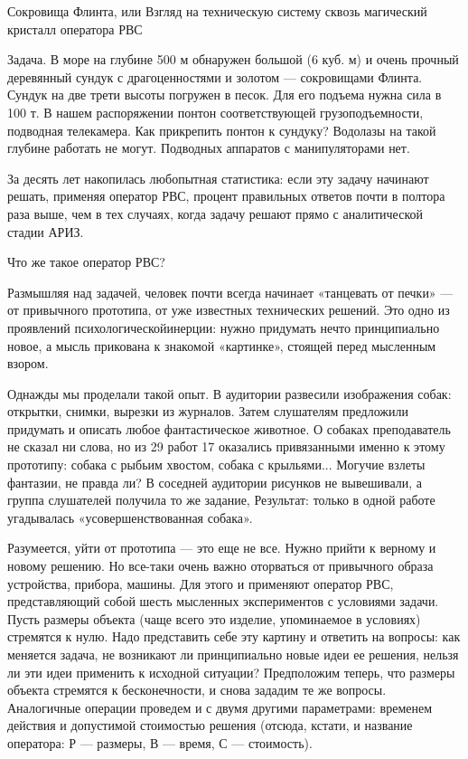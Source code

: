 Сокровища Флинта, или Взгляд  на техническую систему сквозь магический
кристалл оператора РВС

Задача.  В  море  на  глубине  500 м  обнаружен  большой  (6  куб.  м)
и  очень  прочный деревянный  сундук  с  драгоценностями и  золотом  —
сокровищами  Флинта. Сундук  на  две трети  высоты  погружен в  песок.
Для  его подъема  нужна  сила в  100 т.  В  нашем распоряжении  понтон
соответствующей грузоподъемности, подводная телекамера. Как прикрепить
понтон  к  сундуку?  Водолазы  на такой  глубине  работать  не  могут.
Подводных аппаратов с манипуляторами нет.

За  десять  лет  накопилась  любопытная статистика:  если  эту  задачу
начинают  решать, применяя  оператор РВС,  процент правильных  ответов
почти в  полтора раза  выше, чем  в тех  случаях, когда  задачу решают
прямо с аналитической стадии АРИЗ.

Что же такое оператор РВС?

Размышляя  над задачей,  человек почти  всегда начинает  «танцевать от
печки»  —  от  привычного  прототипа,  от  уже  известных  технических
решений.   Это  одно   из  проявлений   психологическойинерции:  нужно
придумать  нечто принципиально  новое,  а мысль  прикована к  знакомой
«картинке», стоящей перед мысленным взором.

Однажды  мы проделали  такой опыт.  В аудитории  развесили изображения
собак:  открытки,  снимки,  вырезки   из  журналов.  Затем  слушателям
предложили  придумать  и  описать  любое  фантастическое  животное.  О
собаках преподаватель не сказал ни слова,  но из 29 работ 17 оказались
привязанными  именно  к  этому  прототипу: собака  с  рыбьим  хвостом,
собака  с  крыльями...  Могучие  взлеты  фантазии,  не  правда  ли?  В
соседней  аудитории  рисунков  не   вывешивали,  а  группа  слушателей
получила то же  задание, Результат: только в  одной работе угадывалась
«усовершенствованная собака».

Разумеется,  уйти от  прототипа  —  это еще  не  все.  Нужно прийти  к
верному  и  новому решению.  Но  все-таки  очень важно  оторваться  от
привычного образа  устройства, прибора, машины. Для  этого и применяют
оператор  РВС, представляющий  собой шесть  мысленных экспериментов  с
условиями  задачи.  Пусть размеры  объекта  (чаще  всего это  изделие,
упоминаемое в  условиях) стремятся к  нулю. Надо представить  себе эту
картину и  ответить на вопросы:  как меняется задача, не  возникают ли
принципиально новые  идеи ее решения,  нельзя ли эти идеи  применить к
исходной ситуации? Предположим теперь, что размеры объекта стремятся к
бесконечности,  и снова  зададим те  же вопросы.  Аналогичные операции
проведем и с двумя другими параметрами: временем действия и допустимой
стоимостью решения (отсюда, кстати, и название оператора: Р — размеры,
В — время, С — стоимость).

